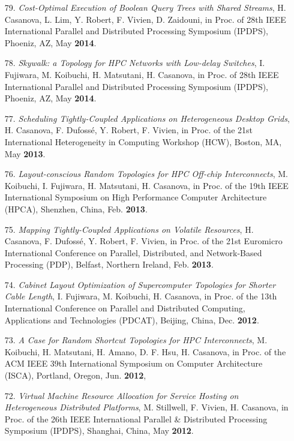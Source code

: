 \begin{enumerate}
\item [79.] {\it Cost-Optimal Execution of Boolean Query Trees with Shared Streams}, H. Casanova, L. Lim, Y. Robert, F. Vivien, D. Zaidouni, in Proc. of
28th IEEE International Parallel and Distributed Processing Symposium (IPDPS),
Phoeniz, AZ, May {\bf 2014}.

\item [78.] {\it Skywalk: a Topology for HPC Networks with Low-delay Switches}, I. Fujiwara, M. Koibuchi, H. Matsutani, H. Casanova, in Proc. of
28th IEEE International Parallel and Distributed Processing Symposium (IPDPS),
Phoeniz, AZ, May {\bf 2014}.

\item[77.] {\it Scheduling Tightly-Coupled Applications on Heterogeneous Desktop Grids},
H. Casanova, F. Dufoss\'e, Y. Robert, F. Vivien,
in Proc. of 
the 21st International Heterogeneity in Computing Workshop (HCW), Boston, MA, May {\bf 2013}.

\item[76.] {\it Layout-conscious Random Topologies for HPC Off-chip Interconnects}, 
M. Koibuchi, I. Fujiwara, H. Matsutani, H. Casanova,
in Proc. of the 19th IEEE International Symposium on High Performance Computer Architecture (HPCA), Shenzhen, China, Feb. {\bf 2013}.

\item[75.] {\it Mapping Tightly-Coupled Applications on Volatile Resources}, H.
Casanova, F. Dufoss\'e, Y. Robert, F. Vivien, in Proc. of the 21st
Euromicro International Conference on Parallel, Distributed, and Network-Based
Processing  (PDP), Belfast, Northern Ireland, Feb. {\bf 2013}.


\item[74.] {\it Cabinet Layout Optimization of Supercomputer Topologies for
Shorter Cable Length}, I. Fujiwara, M. Koibuchi, H. Casanova, in Proc. of
the 13th International Conference on Parallel and Distributed Computing,
Applications and Technologies (PDCAT), Beijing, China, Dec. {\bf 2012}.

\item[73.] {\it A Case for Random Shortcut Topologies for HPC Interconnects}, M.
Koibuchi, H. Matsutani, H. Amano, D. F. Hsu, H. Casanova, 
in Proc. of the ACM IEEE 39th International Symposium on Computer
Architecture (ISCA), Portland, Oregon, Jun. {\bf 2012},


\item[72.] {\it Virtual Machine Resource Allocation for Service Hosting on Heterogeneous Distributed Platforms}, M. Stillwell, F. Vivien, H. Casanova,
in Proc. of the 26th  IEEE International
Parallel \& Distributed Processing Symposium (IPDPS), Shanghai,
China, May {\bf 2012}.  



\end{enumerate}
